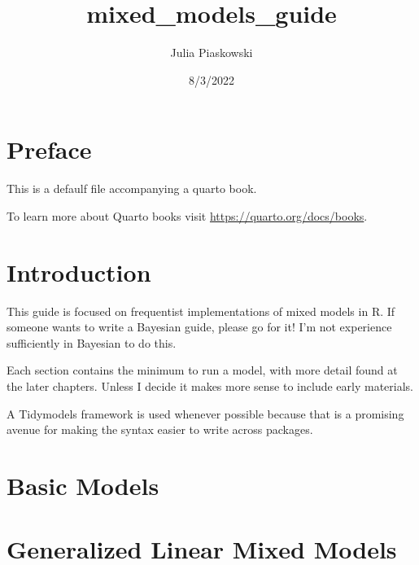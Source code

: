 \documentclass[
  letterpaper,
  DIV=11,
  numbers=noendperiod]{scrreprt}
\title{mixed\_models\_guide}
\author{Julia Piaskowski}
\date{8/3/2022}
\renewcommand*\contentsname{Table of contents}
\newcommand\contentsname{Table of contents}
\begin{document}
\maketitle
\ifdefined\Shaded\renewenvironment{Shaded}{\begin{tcolorbox}[boxrule=0pt, borderline west={3pt}{0pt}{shadecolor}, enhanced, sharp corners, frame hidden, breakable, interior hidden]}{\end{tcolorbox}}\fi

\renewcommand*\contentsname{Table of contents}
{
\hypersetup{linkcolor=}
\setcounter{tocdepth}{2}
\tableofcontents
}

\hypertarget{preface}{%
\chapter*{Preface}\label{preface}}

This is a defaulf file accompanying a quarto book.

To learn more about Quarto books visit
\url{https://quarto.org/docs/books}.


\hypertarget{introduction}{%
\chapter{Introduction}\label{introduction}}

This guide is focused on frequentist implementations of mixed models in
R. If someone wants to write a Bayesian guide, please go for it! I'm not
experience sufficiently in Bayesian to do this.

Each section contains the minimum to run a model, with more detail found
at the later chapters. Unless I decide it makes more sense to include
early materials.

A Tidymodels framework is used whenever possible because that is a
promising avenue for making the syntax easier to write across packages.


\hypertarget{basic-models}{%
\chapter{Basic Models}\label{basic-models}}


\hypertarget{generalized-linear-mixed-models}{%
\chapter{Generalized Linear Mixed
Models}\label{generalized-linear-mixed-models}}
\end{document}
